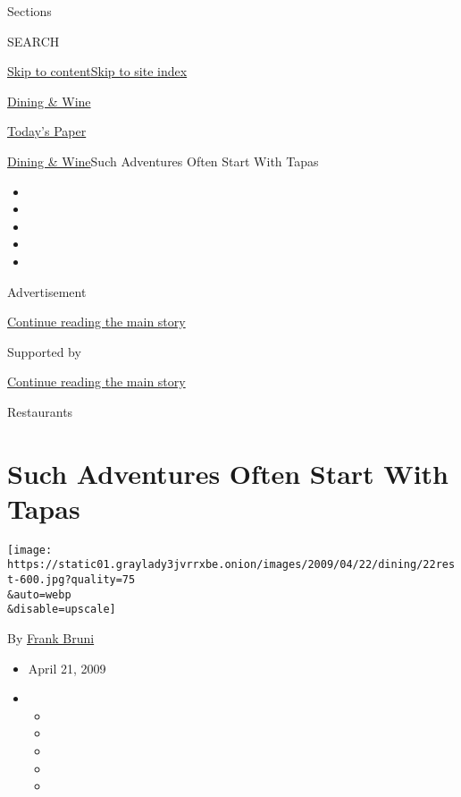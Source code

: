Sections

SEARCH

\protect\hyperlink{site-content}{Skip to
content}\protect\hyperlink{site-index}{Skip to site index}

\href{https://www.nytimes3xbfgragh.onion/pages/dining/index.html}{Dining
\& Wine}

\href{https://myaccount.nytimes3xbfgragh.onion/auth/login?response_type=cookie\&client_id=vi}{}

\href{https://www.nytimes3xbfgragh.onion/section/todayspaper}{Today's
Paper}

\href{/pages/dining/index.html}{Dining \& Wine}\textbar{}Such Adventures
Often Start With Tapas

\begin{itemize}
\item
\item
\item
\item
\item
\end{itemize}

Advertisement

\protect\hyperlink{after-top}{Continue reading the main story}

Supported by

\protect\hyperlink{after-sponsor}{Continue reading the main story}

Restaurants

\hypertarget{such-adventures-often-start-with-tapas}{%
\section{Such Adventures Often Start With
Tapas}\label{such-adventures-often-start-with-tapas}}

\texttt{[image: https://static01.graylady3jvrrxbe.onion/images/2009/04/22/dining/22rest-600.jpg?quality=75\\\&auto=webp\\\&disable=upscale]}

By \href{https://www.nytimes3xbfgragh.onion/by/frank-bruni}{Frank Bruni}

\begin{itemize}
\item
  April 21, 2009
\item
  \begin{itemize}
  \item
  \item
  \item
  \item
  \item
  \end{itemize}
\end{itemize}

